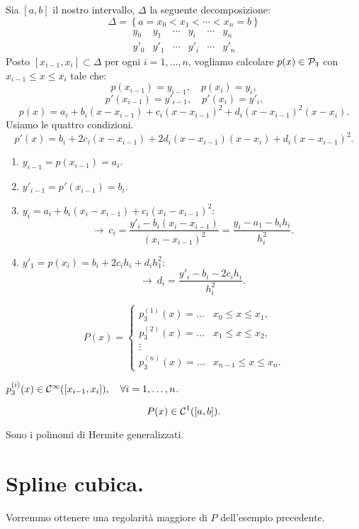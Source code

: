 \begin{exe}
Sia $[a,b]$ il nostro intervallo, $\Delta$ la seguente decomposizione:
\[\Delta = \left\{a = x_0 < x_1 < \cdots < x_n = b\right\}\]
\[\begin{array}{ccccccc}
y_0 & y_1 & \cdots &y_i &\cdots & y_n  \\
y'_0 & y'_1 & \cdots &y'_i &\cdots & y'_n  
\end{array}\]
Posto $[x_{i-1}, x_i] \subset \Delta$ per ogni $i = 1, \ldots, n$, vogliamo 
calcolare $p(x) \in \mathcal{P}_3$ con $x_{i-1}\leq x \leq x_i$ tale che:
\[
p(x_{i-1}) = y_{i-1}, \quad p(x_i) = y_i,
\]
\[
p'(x_{i-1}) = y'_{i-1}, \quad p'(x_i) = y'_i.
\]
\[
p(x) = a_i + b_i(x-x_{i-1})+ c_i(x-x_{i-1})^2 + d_i(x-x_{i-1})^2(x-x_i).
\]
Usiamo le quattro condizioni.
\[
p'(x) = b_i + 2c_i(x-x_{i-1}) + 2d_i(x-x_{i-1})(x-x_i)+ d_i(x-x_{i-1})^2.
\]
\begin{enumerate}
\item $y_{i-1} = p(x_{i-1}) = a_i$.
\item $y'_{i-1} = p'(x_{i-1}) = b_i$.
\item $y_i = a_i + b_i(x_i-x_{i-1})+ c_i(x_i-x_{i-1})^2$:
\[\longrightarrow \ c_i = \frac{y'_i -b_i(x_i-x_{i-1})}{(x_i-x_{i-1})^2}
= \frac{y_i -a_1 -b_i h_i}{h^2_i}.\]
\item $y'_1 = p(x_i) = b_i + 2c_i h_i + d_i h^2_1$:
\[\longrightarrow \ d_i = \frac{y'_i - b_i - 2 c_i h_i}{h^2_i}.\]
\end{enumerate}

\[
P(x) = \left \{
\begin{array}{lc}
p_3^{(1)}(x) = \ldots & x_0 \leq x \leq x_1, \\
p_3^{(2)}(x) = \ldots & x_1 \leq x \leq x_2,\\
\vdots \\
p_3^{(n)}(x) = \ldots & x_{n-1} \leq x \leq x_n .
\end{array}\right.
\]

$p_3^{(i)}(x) \in \mathcal{C}^\infty([x_{i-1}, x_i]), \quad \forall i = 1, \ldots,n$.

\[
P(x) \in \mathcal{C}^1([a,b]).
\]

Sono i polinomi di Hermite generalizzati.
\end{exe}

\section{Spline cubica.}
Vorremmo ottenere una regolarità maggiore di $P$ dell'esempio precedente.

